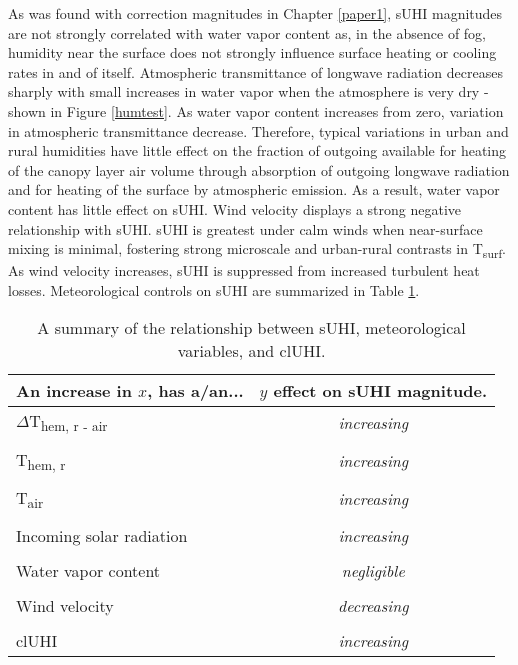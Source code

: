 As was found with correction magnitudes in Chapter \ref{paper1}, sUHI magnitudes are not strongly correlated with water vapor content as, in the absence of fog, humidity near the surface does not strongly influence surface heating or cooling rates in and of itself. Atmospheric transmittance of longwave radiation decreases sharply with small increases in water vapor when the atmosphere is very dry - shown in Figure \ref{humtest}. As water vapor content increases from zero, variation in atmospheric transmittance decrease. Therefore, typical variations in urban and rural humidities have little effect on the fraction of outgoing available for heating of the canopy layer air volume through absorption of outgoing longwave radiation and for heating of the surface by atmospheric emission. As a result, water vapor content has little effect on sUHI. Wind velocity displays a strong negative relationship with sUHI. sUHI is greatest under calm winds when near-surface mixing is minimal, fostering strong microscale and urban-rural contrasts in T\textsubscript{surf}. As wind velocity increases, sUHI is suppressed from increased turbulent heat losses. Meteorological controls on sUHI are summarized in Table \ref{meteo_cont}.

\begin{table}[H]
	\centering
	\caption{A summary of the relationship between sUHI, meteorological variables, and clUHI.}
	\label{meteo_cont}
	\begin{tabular}{lc}
		\toprule 
		An increase in $x$, has a/an... & $y$ effect on sUHI magnitude. \\
		\midrule
		$\Delta$T\textsubscript{hem, r - air} &\textit{increasing} \\
		&\\
		T\textsubscript{hem, r} & \textit{increasing} \\
		&\\
		T\textsubscript{air} & \textit{increasing} \\
		&\\
		Incoming solar radiation & \textit{increasing}  \\
		& \\
		Water vapor content & \textit{negligible} \\
		&\\
		Wind velocity &\textit{decreasing} \\
		&\\
		clUHI &\textit{increasing} \\
		\bottomrule
	\end{tabular} 
\end{table}


